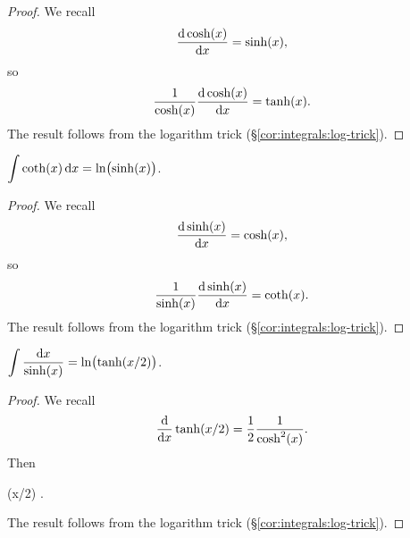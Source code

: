 \begin{proof}
  We recall
  \begin{equation}
\frac{\mathrm{d}\cosh(x)}{\mathrm{d} x}=\sinh(x),
  \end{equation}
  so
  \begin{equation}
\frac{1}{\cosh(x)}\frac{\mathrm{d}\cosh(x)}{\mathrm{d} x}=\tanh(x).
  \end{equation}
The result follows from the logarithm trick (\S\ref{cor:integrals:log-trick}).
\end{proof}

\M $\displaystyle{\int\coth(x)\,\mathrm{d}x = \ln\bigl(\sinh(x)\bigr)}$.
\begin{proof}
  We recall
  \begin{equation}
\frac{\mathrm{d}\sinh(x)}{\mathrm{d} x}=\cosh(x),
  \end{equation}
  so
  \begin{equation}
\frac{1}{\sinh(x)}\frac{\mathrm{d}\sinh(x)}{\mathrm{d} x}=\coth(x).
  \end{equation}
The result follows from the logarithm trick (\S\ref{cor:integrals:log-trick}).
\end{proof}

\M $\displaystyle{\int\frac{\mathrm{d}x}{\sinh(x)} = \ln\bigl(\tanh(x/2)\bigr)}$.

\begin{proof}
  We recall
\begin{equation}
\frac{\mathrm{d}}{\mathrm{d} x}\tanh(x/2) = \frac{1}{2}\frac{1}{\cosh^{2}(x)}.
\end{equation}
  Then
\begin{calculation}
  \tanh(x/2)
  .
\end{calculation}
The result follows from the logarithm trick (\S\ref{cor:integrals:log-trick}).
\end{proof}

